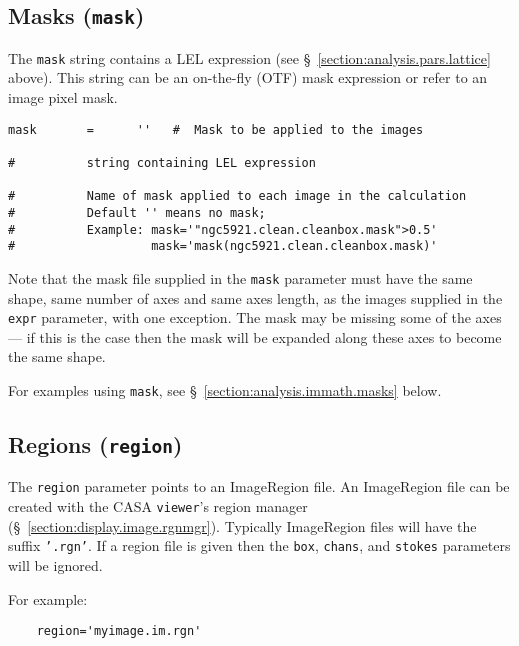 \subsection{Masks ({\tt mask})}
\label{section:analysis.pars.mask}

The {\tt mask} string contains a LEL expression 
(see \S~\ref{section:analysis.pars.lattice} above).  This string
can be an on-the-fly (OTF) mask expression or refer to an 
image pixel mask.
\small
\begin{verbatim}
mask       =      ''   #  Mask to be applied to the images

#          string containing LEL expression

#          Name of mask applied to each image in the calculation
#          Default '' means no mask;  
#          Example: mask='"ngc5921.clean.cleanbox.mask">0.5'
#                   mask='mask(ngc5921.clean.cleanbox.mask)'
\end{verbatim}
\normalsize

Note that the mask file supplied in the {\tt mask} parameter must have
the same shape, same number of axes and same axes length, as the
images supplied in the {\tt expr} parameter, with one exception. The mask
may be missing some of the axes --- if this is the case then the mask
will be expanded along these axes to become the same shape.

For examples using {\tt mask}, see \S~\ref{section:analysis.immath.masks} 
below.


\subsection{Regions ({\tt region})}
\label{section:analysis.pars.regions}

The {\tt region} parameter points to an ImageRegion file.  An
ImageRegion file can be created with the CASA {\tt viewer}'s region
manager (\S~\ref{section:display.image.rgnmgr}).
Typically ImageRegion files will have the suffix {\tt '.rgn'}.  
If a region file is given then the {\tt box}, {\tt chans}, and
{\tt stokes} parameters will be ignored.

For example: 
\small
\begin{verbatim}
    region='myimage.im.rgn'
\end{verbatim}
\normalsize


